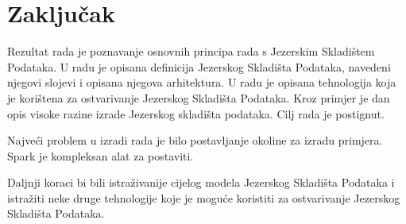 \chapter{Zaključak} \label{chapter:zakljucak}

Rezultat rada je poznavanje osnovnih principa rada s Jezerskim Skladištem
Podataka. U radu je opisana definicija Jezerskog Skladišta Podataka, navedeni
njegovi slojevi i opisana njegova arhitektura. U radu je opisana tehnologija
koja je korištena za ostvarivanje Jezerskog Skladišta Podataka. Kroz primjer
je dan opis visoke razine izrade Jezerskog skladišta podataka. Cilj rada je
postignut.

Najveći problem u izradi rada je bilo postavljanje okoline za izradu primjera.
Spark je kompleksan alat za postaviti.

Daljnji koraci bi bili istraživanije cijelog modela Jezerskog Skladišta Podataka
i istražiti neke druge tehnologije koje je moguće koristiti za ostvarivanje
Jezerskog Skladišta Podataka.
